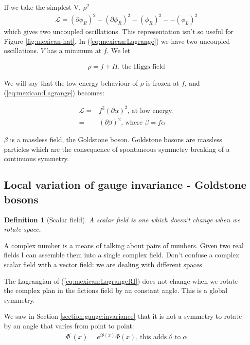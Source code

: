 \documentclass[]{article}
\newtheorem{defn}[thm]{Definition}
\begin{document}
If we take the simplest V, $\rho^2$
\begin{align*}
	\mathcal{L} = (\partial \phi_R)^2 +  (\partial \phi_R)^2 -(\phi_R)^2 - -(\phi_L)^2
\end{align*}
which gives two uncoupled oscillations. This representation isn't so useful for Figure \ref{fig:mexican-hat}. In (\ref{eq:mexican:Lagrange}) we have two uncoupled oscillations. $V$ has a minimum at $f$. We let

\begin{align*}
	\rho = f + H \text{, the Higgs field}
\end{align*}

We will say that the low energy behaviour of $\rho$ is frozen at $f$, and (\ref{eq:mexican:Lagrange}) becomes:

\begin{align*}
	\mathcal{L} =& f^2(\partial \alpha)^2 \text{, at low energy.}\\
	=& (\partial \beta)^2 \text{, where $\beta = f \alpha$}
\end{align*}

$\beta$ is a massless field, the Goldstone boson. Goldstone bosons are massless particles which are the consequence of spontaneous symmetry breaking of a continuous symmetry.

\subsection{Local variation of gauge invariance - Goldstone bosons}

\begin{defn}[Scalar field]
	A scalar field is one which doesn't change when we rotate space.
\end{defn}

A complex number is a means of talking about pairs of numbers. Given two real fields I can assemble them into a single complex field. Don't confuse a complex scalar field with a vector field: we are dealing with different spaces.

The Lagrangian of (\ref{eq:mexican:LagrangeRI})  does not change when we rotate the complex plan in the fictions field by an constant angle. This is a global symmetry.

We saw in Section \ref{section:gauge:invariance} that it is not a  symmetry to rotate by an angle that varies from point to point:
\begin{align*}
	\Phi^\prime (x) = e^{i\theta(x)} \Phi(x) \text{, this adds $\theta$ to $\alpha$}
\end{align*}
\end{document}
